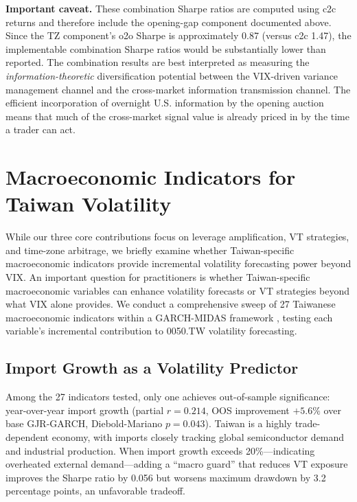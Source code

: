 \textbf{Important caveat.} These combination Sharpe ratios are computed using c2c returns and therefore include the opening-gap component documented above. Since the TZ component's o2o Sharpe is approximately 0.87 (versus c2c 1.47), the implementable combination Sharpe ratios would be substantially lower than reported. The combination results are best interpreted as measuring the \textit{information-theoretic} diversification potential between the VIX-driven variance management channel and the cross-market information transmission channel. The efficient incorporation of overnight U.S. information by the opening auction means that much of the cross-market signal value is already priced in by the time a trader can act.



\section{Macroeconomic Indicators for Taiwan Volatility}
\label{sec:macro}

While our three core contributions focus on leverage amplification, VT strategies, and time-zone arbitrage, we briefly examine whether Taiwan-specific macroeconomic indicators provide incremental volatility forecasting power beyond VIX. An important question for practitioners is whether Taiwan-specific macroeconomic variables can enhance volatility forecasts or VT strategies beyond what VIX alone provides. We conduct a comprehensive sweep of 27 Taiwanese macroeconomic indicators within a GARCH-MIDAS framework \citep{engle2013}, testing each variable's incremental contribution to 0050.TW volatility forecasting.

\subsection{Import Growth as a Volatility Predictor}

Among the 27 indicators tested, only one achieves out-of-sample significance: year-over-year import growth (partial $r = 0.214$, OOS improvement $+5.6\%$ over base GJR-GARCH, Diebold-Mariano $p = 0.043$). Taiwan is a highly trade-dependent economy, with imports closely tracking global semiconductor demand and industrial production. When import growth exceeds 20\%---indicating overheated external demand---adding a ``macro guard'' that reduces VT exposure improves the Sharpe ratio by 0.056 but worsens maximum drawdown by 3.2 percentage points, an unfavorable tradeoff.

